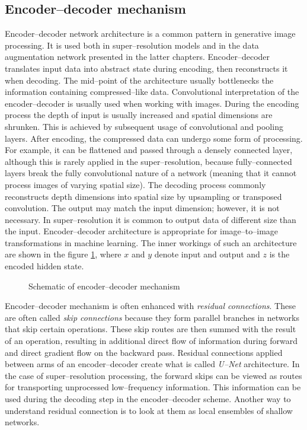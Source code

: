 \subsection{Encoder--decoder mechanism}
Encoder--decoder network architecture is a common pattern in generative image processing.
It is used both in super--resolution models and in the data augmentation network presented in the latter chapters.
Encoder--decoder translates input data into abstract state during encoding, then reconstructs it when decoding.
The mid--point of the architecture usually bottlenecks the information containing compressed--like data.
Convolutional interpretation of the encoder--decoder is usually used when working with images.
During the encoding process the depth of input is usually increased and spatial dimensions are shrunken.
This is achieved by subsequent usage of convolutional and pooling layers.
After encoding, the compressed data can undergo some form of processing.
For example, it can be flattened and passed through a densely connected layer, although this is rarely applied in the super--resolution, because fully--connected layers break the fully convolutional nature of a network (meaning that it cannot process images of varying spatial size).
The decoding process commonly reconstructs depth dimensions into spatial size by upsampling or transposed convolution.
The output may match the input dimension; however, it is not necessary.
In super--resolution it is common to output data of different size than the input.
Encoder--decoder architecture is appropriate for image--to--image transformations in machine learning.
The inner workings of such an architecture are shown in the figure \ref{fig:encoder-decoder}, where $ x $ and $ y $ denote input and output and $ z $ is the encoded hidden state. 
\begin{figure}
    \centering
    
    \caption{Schematic of encoder--decoder mechanism}
    \label{fig:encoder-decoder}
\end{figure}

Encoder--decoder mechanism is often enhanced with \textit{residual connections}.
These are often called \textit{skip connections} because they form parallel branches in networks that skip certain operations.
These skip routes are then summed with the result of an operation, resulting in additional direct flow of information during forward and direct gradient flow on the backward pass.
Residual connections applied between arms of an encoder--decoder create what is called \textit{U--Net} architecture.
In the case of super--resolution processing, the forward skips can be viewed as routes for transporting unprocessed low--frequency information.
This information can be used during the decoding step in the encoder--decoder scheme.
Another way to understand residual connection is to look at them as local ensembles of shallow networks.

